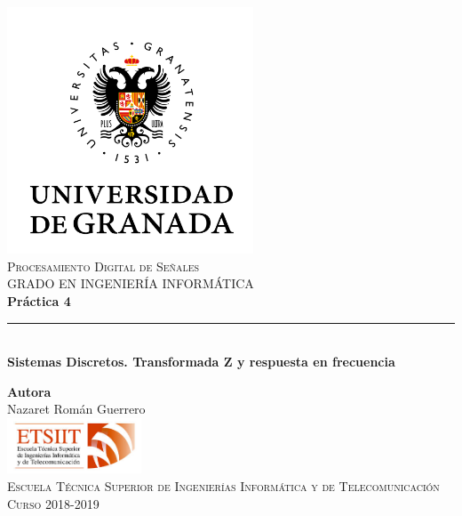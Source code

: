 \documentclass[11pt,a4paper]{article}
\begin{document}
\begin{titlepage}

\begin{minipage}{\textwidth}

\centering
\includegraphics[width=0.55\textwidth]{img/logo.png}\\

\textsc{\Large Procesamiento Digital de Señales\\[0.2cm]}
\textsc{GRADO EN INGENIERÍA INFORMÁTICA}\\[1cm]

{\Huge\bfseries Práctica 4\\}
\noindent\rule[-1ex]{\textwidth}{3pt}\\[3.5ex]
{\large\bfseries Sistemas Discretos. Transformada Z y respuesta en frecuencia}
\end{minipage}

\vspace{1.5cm}
\begin{minipage}{\textwidth}
\centering

\textbf{Autora}\\ {Nazaret Román Guerrero}\\[2.5ex]
\includegraphics[width=0.3\textwidth]{img/etsiit.jpeg}\\[0.1cm]
\vspace{1cm}
\textsc{Escuela Técnica Superior de Ingenierías Informática y de Telecomunicación}\\
\vspace{1cm}
\textsc{Curso 2018-2019}
\end{minipage}
\end{titlepage}
\end{document}
